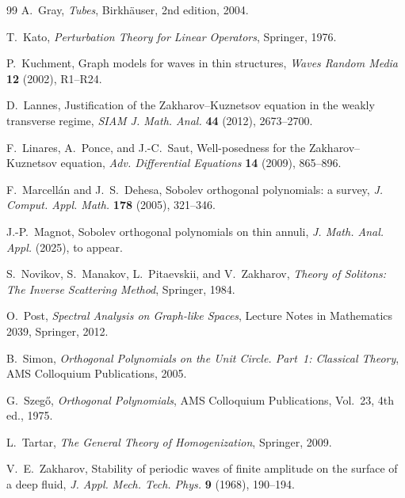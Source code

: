 \documentclass[11pt]{amsart}
\theoremstyle{plain}
\theoremstyle{definition}
\theoremstyle{remark}
\theoremstyle{remark}
\begin{document}
\begin{thebibliography}{99}
A.~Gray,
\emph{Tubes},
Birkhäuser, 2nd edition, 2004.

T.~Kato,
\emph{Perturbation Theory for Linear Operators},
Springer, 1976.

P.~Kuchment,
Graph models for waves in thin structures,
\emph{Waves Random Media} \textbf{12} (2002), R1--R24.

D.~Lannes,
Justification of the Zakharov--Kuznetsov equation in the weakly transverse regime,
\emph{SIAM J. Math. Anal.} \textbf{44} (2012), 2673--2700.

F.~Linares, A.~Ponce, and J.-C.~Saut,
Well-posedness for the Zakharov--Kuznetsov equation,
\emph{Adv. Differential Equations} \textbf{14} (2009), 865--896.

F.~Marcellán and J.~S.~Dehesa,
Sobolev orthogonal polynomials: a survey,
\emph{J. Comput. Appl. Math.} \textbf{178} (2005), 321--346.

J.-P.~Magnot,
Sobolev orthogonal polynomials on thin annuli,
\emph{J. Math. Anal. Appl.} (2025), to appear.

S.~Novikov, S.~Manakov, L.~Pitaevskii, and V.~Zakharov,
\emph{Theory of Solitons: The Inverse Scattering Method},
Springer, 1984.

O.~Post,
\emph{Spectral Analysis on Graph-like Spaces},
Lecture Notes in Mathematics 2039, Springer, 2012.

B.~Simon,
\emph{Orthogonal Polynomials on the Unit Circle. Part~1: Classical Theory},
AMS Colloquium Publications, 2005.

G.~Szegő,
\emph{Orthogonal Polynomials},
AMS Colloquium Publications, Vol.~23, 4th ed., 1975.

L.~Tartar,
\emph{The General Theory of Homogenization},
Springer, 2009.

V.~E.~Zakharov,
Stability of periodic waves of finite amplitude on the surface of a deep fluid,
\emph{J. Appl. Mech. Tech. Phys.} \textbf{9} (1968), 190--194.

\end{thebibliography}
\end{document}
